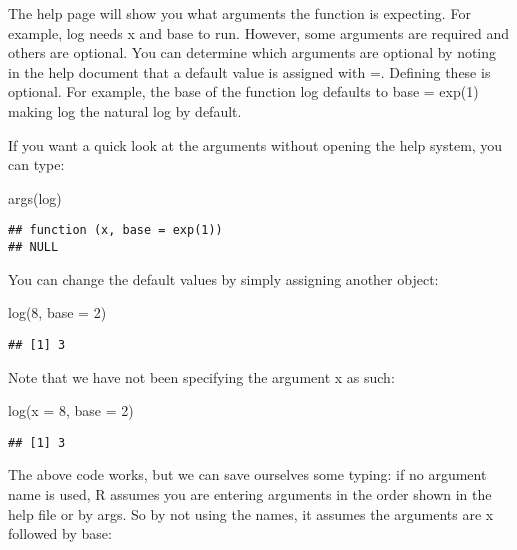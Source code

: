 \documentclass[
]{article}
\newenvironment{Shaded}{\begin{snugshade}}{\end{snugshade}}
\newcommand{\AttributeTok}[1]{\textcolor[rgb]{0.77,0.63,0.00}{#1}}
\newcommand{\DecValTok}[1]{\textcolor[rgb]{0.00,0.00,0.81}{#1}}
\newcommand{\FunctionTok}[1]{\textcolor[rgb]{0.00,0.00,0.00}{#1}}
\newcommand{\NormalTok}[1]{#1}
\begin{document}
The help page will show you what arguments the function is expecting.
For example, log needs x and base to run. However, some arguments are
required and others are optional. You can determine which arguments are
optional by noting in the help document that a default value is assigned
with =. Defining these is optional. For example, the base of the
function log defaults to base = exp(1) making log the natural log by
default.

If you want a quick look at the arguments without opening the help
system, you can type:

\begin{Shaded}
\begin{Highlighting}[]
\FunctionTok{args}\NormalTok{(log)}
\end{Highlighting}
\end{Shaded}

\begin{verbatim}
## function (x, base = exp(1)) 
## NULL
\end{verbatim}

You can change the default values by simply assigning another object:

\begin{Shaded}
\begin{Highlighting}[]
\FunctionTok{log}\NormalTok{(}\DecValTok{8}\NormalTok{, }\AttributeTok{base =} \DecValTok{2}\NormalTok{)}
\end{Highlighting}
\end{Shaded}

\begin{verbatim}
## [1] 3
\end{verbatim}

Note that we have not been specifying the argument x as such:

\begin{Shaded}
\begin{Highlighting}[]
\FunctionTok{log}\NormalTok{(}\AttributeTok{x =} \DecValTok{8}\NormalTok{, }\AttributeTok{base =} \DecValTok{2}\NormalTok{)}
\end{Highlighting}
\end{Shaded}

\begin{verbatim}
## [1] 3
\end{verbatim}

The above code works, but we can save ourselves some typing: if no
argument name is used, R assumes you are entering arguments in the order
shown in the help file or by args. So by not using the names, it assumes
the arguments are x followed by base:
\end{document}

